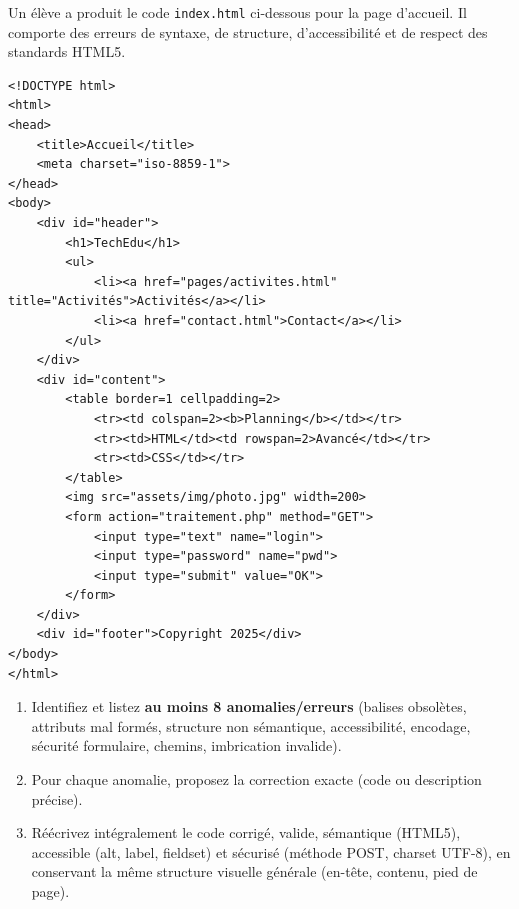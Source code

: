 \documentclass[11pt]{article}
\begin{document}
\begin{exercice}
Un élève a produit le code \texttt{index.html} ci-dessous pour la page d'accueil. Il comporte des erreurs de syntaxe, de structure, d'accessibilité et de respect des standards HTML5.
\begin{verbatim}
<!DOCTYPE html>
<html>
<head>
    <title>Accueil</title>
    <meta charset="iso-8859-1">
</head>
<body>
    <div id="header">
        <h1>TechEdu</h1>
        <ul>
            <li><a href="pages/activites.html" title="Activités">Activités</a></li>
            <li><a href="contact.html">Contact</a></li>
        </ul>
    </div>
    <div id="content">
        <table border=1 cellpadding=2>
            <tr><td colspan=2><b>Planning</b></td></tr>
            <tr><td>HTML</td><td rowspan=2>Avancé</td></tr>
            <tr><td>CSS</td></tr>
        </table>
        <img src="assets/img/photo.jpg" width=200>
        <form action="traitement.php" method="GET">
            <input type="text" name="login">
            <input type="password" name="pwd">
            <input type="submit" value="OK">
        </form>
    </div>
    <div id="footer">Copyright 2025</div>
</body>
</html>
\end{verbatim}
\begin{enumerate}
    \item Identifiez et listez \textbf{au moins 8 anomalies/erreurs} (balises obsolètes, attributs mal formés, structure non sémantique, accessibilité, encodage, sécurité formulaire, chemins, imbrication invalide).
    \item Pour chaque anomalie, proposez la correction exacte (code ou description précise).
    \item Réécrivez intégralement le code corrigé, valide, sémantique (HTML5), accessible (alt, label, fieldset) et sécurisé (méthode POST, charset UTF-8), en conservant la même structure visuelle générale (en-tête, contenu, pied de page).
\end{enumerate}
\end{exercice}
\end{document}
